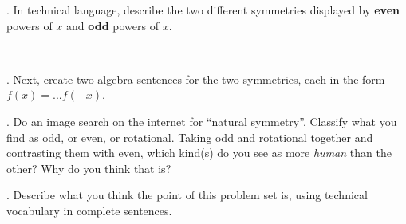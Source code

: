 \begin{multicols*}{2}
\vspace{0.2cm}

. In technical language, describe the two different symmetries displayed by \textbf{even} powers of
$x$ and \textbf{odd} powers of $x$. 

\vspace{2.7cm}
~~~

\noindent
{}





\vspace{0.5cm}
. Next, create two algebra sentences for the two symmetries, each
in the form $f(x)=...f(-x)$.

\vspace{2cm}

. Do an image search on the internet for ``natural symmetry''.  Classify what you find as odd, or
even, or rotational.  Taking odd and rotational together and contrasting them with even, 
which kind(s) do you see as more \textit{human} than the other?  Why do you think that is?


\vspace{5cm}
. Describe what you think the point of this problem set is, using technical vocabulary in complete
sentences.
\end{multicols*}
